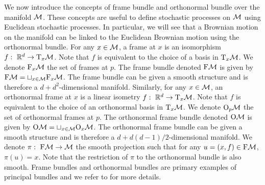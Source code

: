 We now introduce the concepts of frame bundle and orthonormal bundle over the
manifold $\mathcal M$. These concepts are useful to define stochastic processes on $\mathcal M$
using Euclidean stochastic processes. In particular, we will see that a Brownian
motion on the manifold can be linked to the Euclidean Brownian motion using the
orthonormal bundle. For any $x \in \mathcal M$, a frame at $x$ is an isomorphism
$f: \ \mathbb{R}^d \to \mathrm{T}_x \mathcal M$. Note that $f$ is equivalent to the choice of
a basis in $\mathrm{T}_x \mathcal M$. We denote $\mathrm{F}_x \mathcal M$ the set of frames at
$p$. The frame bundle denoted $\mathrm{F}\mathcal{M}$ is given by
$\mathrm{F}\mathcal{M} = \sqcup_{x \in \mathcal M} \mathrm{F}_x \mathcal M$. The frame bundle can be given a
smooth structure and is therefore a $d + d^2$-dimensional manifold. Similarly,
for any $x \in \mathcal M$, an orthonormal frame at $x$ is a linear isometry
$f: \ \mathbb{R}^d \to \mathrm{T}_x \mathcal M$. Note that $f$ is equivalent to the choice of
an orthonormal basis in $\mathrm{T}_x \mathcal M$. We denote $\mathrm{O}_p \mathcal M$ the set
of orthonormal frames at $p$. The orthonormal frame bundle denoted $\mathrm{O}\mathcal{M}$ is
given by $\mathrm{O}\mathcal{M} = \sqcup_{x \in \mathcal M} \mathrm{O}_x \mathcal M$. The orthonormal frame bundle
can be given a smooth structure and is therefore a $d + d(d-1)/2$-dimensional
manifold. We denote $\pi: \ \mathrm{F}\mathcal{M} \to \mathcal M$ the smooth projection such that for any
$u = (x,f) \in \mathrm{F}\mathcal{M}$, $\pi(u) = x$. Note that the restriction of $\pi$ to the
orthonormal bundle is also smooth.  Frame bundles and orthonormal bundles are
primary examples of principal bundles and we refer to \cite{kolar2013natural}
for more details.

